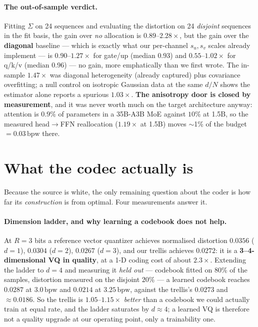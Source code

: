 \documentclass[11pt,a4paper]{article}
\newcommand{\bpw}{\,\mathrm{bpw}}
\begin{document}
\paragraph{The out-of-sample verdict.} Fitting $\Sigma$ on 24 sequences and evaluating the
distortion on 24 \emph{disjoint} sequences in the fit basis, the gain over \emph{no} allocation is
$0.89$--$2.28\times$, but the gain over the \textbf{diagonal} baseline --- which is exactly what
our per-channel $s_u,s_v$ scales already implement --- is $0.90$--$1.27\times$ for gate/up (median $0.93$) and
$0.55$--$1.02\times$ for q/k/v (median $0.96$) --- no gain, more emphatically than we first wrote. The in-sample $1.47\times$ was diagonal heterogeneity (already
captured) plus covariance overfitting; a null control on isotropic Gaussian data at the same
$d/N$ shows the estimator alone reports a spurious $1.03\times$. \textbf{The anisotropy door is
closed by measurement}, and it was never worth much on the target architecture anyway: attention
is $0.9\%$ of parameters in a 35B-A3B MoE against $10\%$ at 1.5B, so the measured head$\to$FFN
reallocation ($1.19\times$ at 1.5B) moves $\sim$1\% of the budget $=0.03\bpw$ there.

\section{What the codec actually is}
\label{sec:codec}

Because the source is white, the only remaining question about the coder is how far its
\emph{construction} is from optimal. Four measurements answer it.

\paragraph{Dimension ladder, and why learning a codebook does not help.} At $R=3$ bits a
reference vector quantizer achieves normalised distortion $0.0356$ ($d=1$), $0.0304$ ($d=2$),
$0.0267$ ($d=3$), and our trellis achieves $0.0272$: it is a \textbf{3--4-dimensional VQ in
quality}, at a 1-D coding cost of about $2.3\times$. Extending the ladder to $d=4$ and measuring
it \emph{held out} --- codebook fitted on $80\%$ of the samples, distortion measured on the
disjoint $20\%$ --- a learned codebook reaches $0.0287$ at $3.0\bpw$ and $0.0214$ at $3.25\bpw$,
against the trellis's $0.0273$ and $\approx0.0186$. So the trellis is $1.05$--$1.15\times$
\emph{better} than a codebook we could actually train at equal rate, and the ladder saturates by
$d\approx4$; a learned VQ is therefore not a quality upgrade at our operating point, only a
trainability one.
\end{document}
